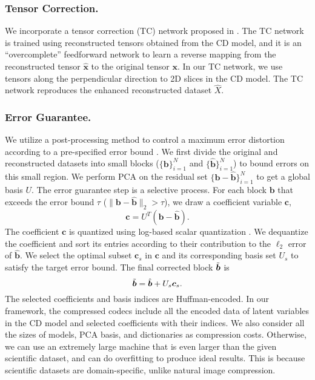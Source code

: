 \subsubsection{Tensor Correction.}
We incorporate a tensor correction (TC) network proposed in \cite{JL-S3D_arxiv}. The TC network is trained using reconstructed tensors obtained from the CD model, and it is an ``overcomplete'' feedforward network to learn a reverse mapping from the reconstructed tensor $\hat{\boldsymbol{x}}$ to the original tensor $\boldsymbol{x}$. In our TC network, we use tensors along the perpendicular direction to 2D slices in the CD model. The TC network reproduces the enhanced reconstructed dataset $\hat{X}$.
\vspace{-0.2cm}
\subsubsection{Error Guarantee.}
We utilize a post-processing method to control a maximum error distortion according to a pre-specified error bound \cite{JL-GAE,JL-S3D_arxiv}. We first divide the original and reconstructed datasets into small blocks ($\{\boldsymbol{b}\}_{i=1}^N$ and $\{\hat{\boldsymbol{b}}\}_{i=1}^N$) to bound errors on this small region. We perform PCA on the residual set $\{\boldsymbol{b}-\hat{\boldsymbol{b}}\}_{i=1}^N$ to get a global basis $U$. The error guarantee step is a selective process. For each block $\boldsymbol{b}$ that exceeds the error bound $\tau$ ($\|\boldsymbol{b}-\hat{\boldsymbol{b}}\|_{2}> \tau$), we draw a coefficient variable $\boldsymbol{c}$,
\begin{equation}
    \boldsymbol{c}=U^T\left(\boldsymbol{b}-\hat{\boldsymbol{b}}\right).
\end{equation}
The coefficient $\boldsymbol{c}$ is quantized using log-based scalar quantization \cite{JL-S3D_arxiv}. We dequantize the coefficient and sort its entries according to their contribution to the $\ell_2$ error of $\hat{\boldsymbol{b}}$. We select the optimal subset $\boldsymbol{c}_s$ in $\boldsymbol{c}$ and its corresponding basis set $U_s$ to satisfy the target error bound. The final corrected block $\Tilde{\boldsymbol{b}}$ is
\begin{equation}
    \Tilde{\boldsymbol{b}}=\hat{\boldsymbol{b}}+U_{s}\boldsymbol{c}_{s}.
\end{equation}
The selected coefficients and basis indices are Huffman-encoded. In our framework, the compressed codecs include all the encoded data of latent variables in the CD model and selected coefficients with their indices. We also consider all the sizes of models, PCA basis, and dictionaries as compression costs. Otherwise, we can use an extremely large machine that is even larger than the given scientific dataset, and can do overfitting to produce ideal results. This is because scientific datasets are domain-specific, unlike natural image compression.